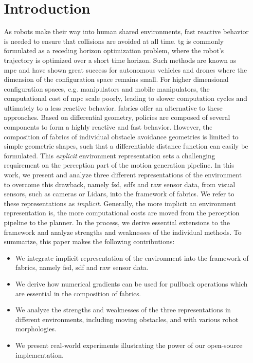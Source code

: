 \section{Introduction}
\label{sec:ral24_intro}
%
As robots make their way into human shared environments,
fast reactive behavior is needed to ensure that collisions are avoided
at all time. \acf{tg} is commonly formulated as a receding
horizon optimization problem, where the robot's trajectory
is optimized over a short time horizon. Such methods are
known as \acf{mpc} and have shown great success for autonomous
vehicles and drones where the dimension of the configuration
space remains small. For higher dimensional
configuration spaces, e.g. manipulators and mobile
manipulators, the computational cost of \ac{mpc} scale
poorly, leading to slower computation cycles and ultimately
to a less reactive behavior. \acf{fabrics} offer an
alternative to these approaches. Based on differential
geometry, policies are composed of several components to form a highly reactive
and fast behavior. However, the composition of \ac{fabrics} of
individual obstacle avoidance geometries is limited to simple geometric shapes,
such that a differentiable distance function can easily be
formulated. This \textit{explicit} environment
representation
sets a challenging requirement on the perception part of the motion generation
pipeline. In this work, we present and analyze three
different representations of the environment to 
overcome this drawback, namely \acf{fsd}, 
\acfp{sdf} and raw sensor data, from visual sensors, such as
cameras or Lidars, into the framework of
\ac{fabrics}. We refer to these representations as
\textit{implicit}.
Generally, the more implicit an environment representation is, the more
computational costs are moved from the perception pipeline to the planner.
In the process, we derive essential extensions to the framework and
analyze strengths and weaknesses of the individual methods. To summarize, this
paper makes the following contributions:
\begin{itemize}
  \item We integrate implicit representation of the environment into the
    framework of \ac{fabrics}, namely \ac{fsd}, \ac{sdf}
    and raw sensor data.
  \item We derive how numerical gradients can be used for pullback operations
    which are essential in the composition of \ac{fabrics}.
  \item We analyze the strengths and weaknesses of the three representations in
    different environments, including moving obstacles, and
    with various robot morphologies.
  \item We present real-world experiments illustrating the power of our
    open-source implementation.
\end{itemize}


